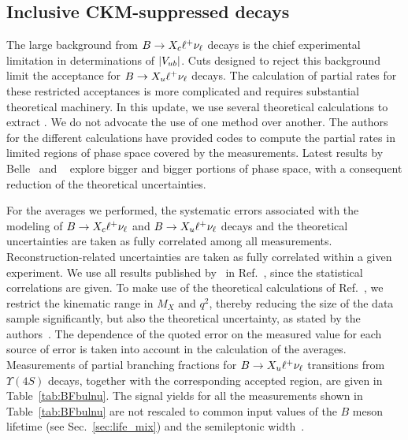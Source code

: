 \subsection{Inclusive CKM-suppressed decays}
\label{slbdecays_b2uincl}
The large background from $B\to X_c\ell^+\nu_\ell$ decays is the chief
experimental limitation in determinations of $|V_{ub}|$.  Cuts designed to
reject this background limit the acceptance for $B\to X_u\ell^+\nu_\ell$
decays. The calculation of partial rates for these restricted
acceptances is more complicated and requires substantial theoretical machinery.
In this update, we use several theoretical calculations
to extract \vub. We do not advocate the use of one method over another.
The authors for the different calculations have provided 
codes to compute the partial rates in limited regions of phase space covered by the measurements. 
Latest results by Belle~\cite{ref:belle-multivariate} and \babar~\cite{Lees:2011fv} 
explore bigger and bigger portions of phase space, with a consequent reduction of the theoretical 
uncertainties. 

For the averages we performed, the systematic errors associated with the
modeling of $B\to X_c\ell^+\nu_\ell$ and $B\to X_u\ell^+\nu_\ell$ decays and the theoretical
uncertainties are taken as fully correlated among all measurements.
Reconstruction-related uncertainties are taken as fully correlated within a given experiment.
We use all results published by \babar\ in Ref.~\cite{Lees:2011fv}, since the 
statistical correlations are given. 
To make use of the theoretical calculations of Ref.~\cite{ref:BLL}, we restrict the
kinematic range in $M_X$ and $q^2$, thereby reducing the size of the data
sample significantly, but also the theoretical uncertainty, as stated by the
authors~\cite{ref:BLL}.
The dependence of the quoted error on the measured value for each source of error
is taken into account in the calculation of the averages.
Measurements of partial branching fractions for $B\to X_u\ell^+\nu_\ell$
transitions from $\Upsilon(4S)$ decays, together with the corresponding accepted region, 
are given in Table~\ref{tab:BFbulnu}.  
The signal yields for all the measurements shown in Table~\ref{tab:BFbulnu}
are not rescaled to common input values of the $B$ meson lifetime (see
Sec.~\ref{sec:life_mix}) and the semileptonic width~\cite{PDG_2014}.

